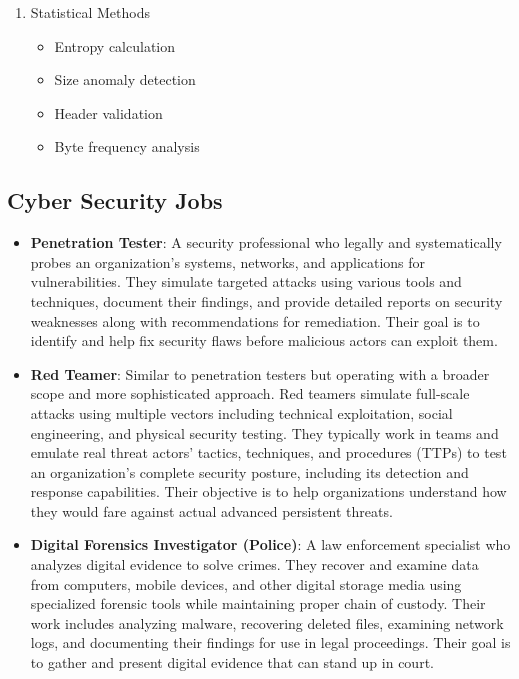 \begin{enumerate}
    \item Statistical Methods
    \begin{itemize}
        \item Entropy calculation
        \item Size anomaly detection
        \item Header validation
        \item Byte frequency analysis
    \end{itemize}
\end{enumerate}

\subsection*{Cyber Security Jobs}
\begin{itemize}
    \item \textbf{Penetration Tester}: A security professional who legally and systematically probes an organization's systems, networks, and applications for vulnerabilities. They simulate targeted attacks using various tools and techniques, document their findings, and provide detailed reports on security weaknesses along with recommendations for remediation. Their goal is to identify and help fix security flaws before malicious actors can exploit them.

    \item \textbf{Red Teamer}: Similar to penetration testers but operating with a broader scope and more sophisticated approach. Red teamers simulate full-scale attacks using multiple vectors including technical exploitation, social engineering, and physical security testing. They typically work in teams and emulate real threat actors' tactics, techniques, and procedures (TTPs) to test an organization's complete security posture, including its detection and response capabilities. Their objective is to help organizations understand how they would fare against actual advanced persistent threats.

    \item \textbf{Digital Forensics Investigator (Police)}: A law enforcement specialist who analyzes digital evidence to solve crimes. They recover and examine data from computers, mobile devices, and other digital storage media using specialized forensic tools while maintaining proper chain of custody. Their work includes analyzing malware, recovering deleted files, examining network logs, and documenting their findings for use in legal proceedings. Their goal is to gather and present digital evidence that can stand up in court.


\end{itemize}
